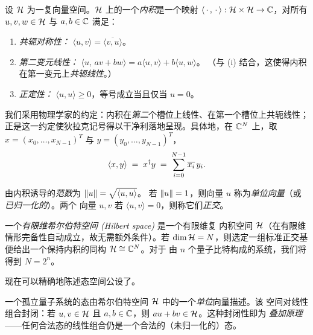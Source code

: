 \begin{definition}[复内积空间]\label{def:lec01-inner}
设 $\mathcal{H}$ 为一复向量空间。$\mathcal{H}$ 上的一个\emph{内积}是一个映射
$\langle\,\cdot\,,\,\cdot\,\rangle:\mathcal{H}\times\mathcal{H}\to\mathbb{C}$，对所有
$u,v,w\in\mathcal{H}$ 与 $a,b\in\mathbb{C}$ 满足：
\begin{enumerate}[label=(\roman*)]
  \item \emph{共轭对称性：} $\langle u,v\rangle=\overline{\langle v,u\rangle}$。
  \item \emph{第二变元线性：}
        $\langle u,\,a v+b w\rangle=a\langle u,v\rangle+b\langle u,w\rangle$。
        （与 (i) 结合，这使得内积在第一变元上\emph{共轭线性}。）
  \item \emph{正定性：} $\langle u,u\rangle\ge 0$，等号成立当且仅当 $u=0$。
\end{enumerate}
\end{definition}

我们采用物理学家的约定：内积在\emph{第二}个槽位上线性、在第一个槽位上共轭线性；
正是这一约定使狄拉克记号得以干净利落地呈现。具体地，在 $\mathbb{C}^{N}$ 上，取
$x=(x_0,\dots,x_{N-1})^{T}$ 与 $y=(y_0,\dots,y_{N-1})^{T}$，
\begin{equation}
  \langle x,y\rangle \;=\; x^{\dagger} y \;=\; \sum_{i=0}^{N-1}\overline{x_i}\,y_i .
\end{equation}

\begin{definition}[范数与单位向量]\label{def:lec01-norm}
由内积诱导的\emph{范数}为 $\left\lVert u \right\rVert=\sqrt{\langle u,u\rangle}$。
若 $\left\lVert u \right\rVert=1$，则向量 $u$ 称为\emph{单位向量}（或\emph{已归一化的}）。两个
向量 $u,v$ 若 $\langle u,v\rangle=0$，则称它们\emph{正交}。
\end{definition}

\begin{definition}[有限维希尔伯特空间]\label{def:lec01-hilbert}
一个\emph{有限维希尔伯特空间 (Hilbert space)} 是一个有限维复
内积空间 $\mathcal{H}$（在有限维情形完备性自动成立，故无需额外条件）。若 $\dim\mathcal{H}=N$，则选定一组标准正交基
便给出一个保持内积的同构 $\mathcal{H}\cong\mathbb{C}^{N}$。对于
由 $n$ 个量子比特构成的系统，我们将得到 $N=2^{n}$。
\end{definition}

现在可以精确地陈述态空间公设了。

\begin{remark}[态空间公设]
一个孤立量子系统的态由希尔伯特空间 $\mathcal{H}$ 中的一个\emph{单位}向量描述。该
空间对线性组合封闭：若
$u,v\in\mathcal{H}$ 且 $a,b\in\mathbb{C}$，则 $a u+b v\in\mathcal{H}$。这种封闭性即为
\emph{叠加原理}——任何合法态的线性组合仍是一个合法的（未归一化的）态。
\end{remark}

